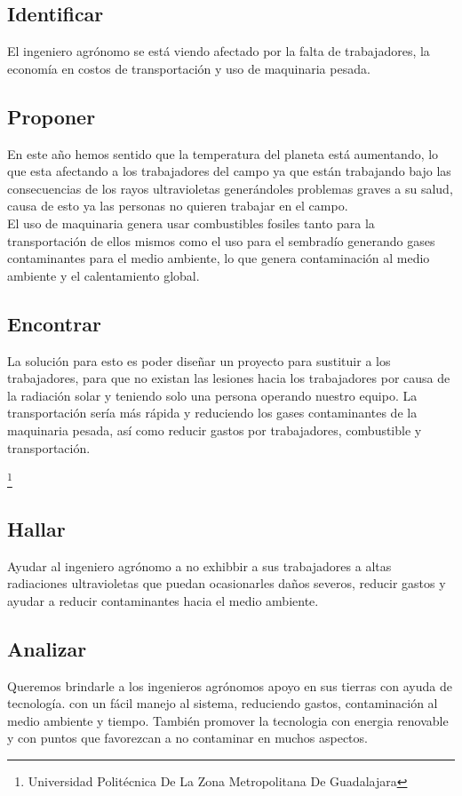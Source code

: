 \documentclass[11pt,a4paper]{article}
\begin{document}
\subsection{Identificar}
El ingeniero agrónomo se está viendo afectado por la falta de trabajadores, la economía en costos de transportación y uso de maquinaria pesada.
\subsection{Proponer}
En este año hemos sentido que la temperatura del planeta está aumentando, lo que esta afectando a los trabajadores del campo ya que están trabajando bajo las consecuencias de los rayos ultravioletas generándoles problemas graves a su salud, causa de esto ya las personas no quieren trabajar en el campo.\\
El uso de maquinaria genera usar combustibles fosiles tanto para la transportación de ellos mismos como el uso para el sembradío generando gases contaminantes para el medio ambiente, lo que genera contaminación al medio ambiente y el calentamiento global.
\subsection{Encontrar}
La solución para esto es poder diseñar un proyecto para sustituir a los trabajadores, para que no existan las lesiones hacia los trabajadores por causa de la radiación solar y teniendo solo una persona operando nuestro equipo. La transportación sería más rápida y reduciendo los gases contaminantes de la maquinaria pesada, así como reducir gastos por trabajadores, combustible y transportación.

\footnote{Universidad Politécnica De La Zona Metropolitana De Guadalajara} 
\pagebreak

\subsection{Hallar}
Ayudar al ingeniero agrónomo a no exhibbir a sus trabajadores a altas radiaciones ultravioletas que puedan ocasionarles daños severos, reducir gastos y ayudar a reducir contaminantes hacia el medio ambiente.
\subsection{Analizar}
Queremos brindarle a los ingenieros agrónomos apoyo en sus tierras con ayuda de tecnología. con un fácil manejo al sistema, reduciendo gastos, contaminación al medio ambiente y tiempo. También promover la tecnologia con energia renovable y con puntos que favorezcan a no contaminar en muchos aspectos.
\end{document}
